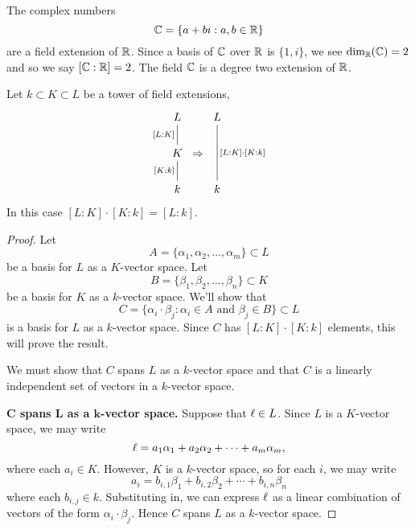\documentclass{ximera}
\begin{document}
\begin{example}
  The complex numbers
  \[
  \mathbb C = \{a+bi:a,b\in\mathbb R\}
  \]
  are a field extension of $\mathbb R$. Since a basis of $\mathbb C$ over $\mathbb R$ is
  $\{1,i\}$, we see $\dim_\mathbb R(\mathbb C)=2$ and so we say $[\mathbb C:\mathbb R]=2$. The
  field $\mathbb C$ is a degree two extension of $\mathbb R$.
\end{example}


\begin{lemma}\label{L:dm}
  Let $k\subset K\subset L$ be a tower of field extensions,
  \[
  \begin{tikzcd}[column sep=0pt]
    L\ar[d,-,"{[L:K]}",swap]  &             &  L\ar[dd,-,"{[L:K]\cdot [K:k]}"]   \\
    K \ar[d,-,"{[K:k]}",swap] & \Rightarrow &     \\
    k                         &             &  k
  \end{tikzcd}
  \]
  In this case $[L:K]\cdot [K:k] = [L:k]$.
  \begin{proof}
    Let
    \[
    A = \{\alpha_1,\alpha_2,\dots,\alpha_m\}\subset L
    \]
    be a basis for $L$ as a $K$-vector space. Let
    \[
    B = \{\beta_1,\beta_2,\dots,\beta_n\}\subset K
    \]
    be a basis for $K$ as a $k$-vector space. We'll show that
    \[
    C = \{\alpha_i\cdot \beta_j:\alpha_i\in A \text{ and }\beta_j\in B\} \subset L
    \]
    is a basis for $L$ as a $k$-vector space. Since $C$ has
    $[L:K]\cdot [K:k]$ elements, this will prove the result.

    We must show that $C$ spans $L$ as a $k$-vector space and that $C$
    is a linearly independent set of vectors in a $k$-vector space.

    \textbf{$\boldsymbol C$ spans $\boldsymbol L$ as a $\boldsymbol k$-vector space.} Suppose
    that $\ell\in L$. Since $L$ is a $K$-vector space, we may write
    \[
    \ell = a_1\alpha_1 + a_2 \alpha_2 + \cdots + a_m\alpha_m,
    \]
    where each $a_i\in K$. However, $K$ is a $k$-vector space, so for
    each $i$, we may write
    \[
    a_i = b_{i,1}\beta_1 +  b_{i,2}\beta_2 + \cdots +   b_{i,n}\beta_n
    \]
    where each $b_{i,j}\in k$. Substituting in, we can express $\ell$ as
    a linear combination of vectors of the form $\alpha_i\cdot
    \beta_j$. Hence $C$ spans $L$ as a $k$-vector space.




\end{proof}
\end{lemma}
\end{document}
